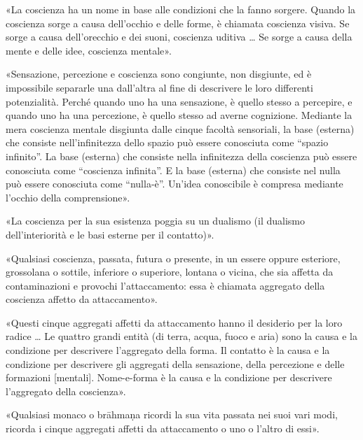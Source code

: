 
«La coscienza ha un nome in base alle condizioni che la fanno sorgere. Quando la
coscienza sorge a causa dell’occhio e delle forme, è chiamata coscienza visiva.
Se sorge a causa dell’orecchio e dei suoni, coscienza uditiva … Se sorge a causa
della mente e delle idee, coscienza mentale».


«Sensazione, percezione e coscienza sono congiunte, non disgiunte, ed è
impossibile separarle una dall’altra al fine di descrivere le loro differenti
potenzialità. Perché quando uno ha una sensazione, è quello stesso a percepire,
e quando uno ha una percezione, è quello stesso ad averne cognizione. Mediante
la mera coscienza mentale disgiunta dalle cinque facoltà sensoriali, la base
(esterna) che consiste nell’infinitezza dello spazio può essere conosciuta come
“spazio infinito”. La base (esterna) che consiste nella infinitezza della
coscienza può essere conosciuta come “coscienza infinita”. E la base (esterna)
che consiste nel nulla può essere conosciuta come “nulla-è”. Un’idea conoscibile
è compresa mediante l’occhio della comprensione».


«La coscienza per la sua esistenza poggia su un dualismo (il dualismo
dell’interiorità e le basi esterne per il contatto)».


«Qualsiasi coscienza, passata, futura o presente, in un essere oppure esteriore,
grossolana o sottile, inferiore o superiore, lontana o vicina, che sia affetta
da contaminazioni e provochi l’attaccamento: essa è chiamata aggregato della
coscienza affetto da attaccamento».


«Questi cinque aggregati affetti da attaccamento hanno il desiderio per la loro
radice … Le quattro grandi entità (di terra, acqua, fuoco e aria) sono la causa
e la condizione per descrivere l’aggregato della forma. Il contatto è la causa e
la condizione per descrivere gli aggregati della sensazione, della percezione e
delle formazioni [mentali]. Nome-e-forma è la causa e la condizione per
descrivere l’aggregato della coscienza».


«Qualsiasi monaco o brāhmaṇa ricordi la sua vita passata nei suoi vari modi,
ricorda i cinque aggregati affetti da attaccamento o uno o l’altro di essi».

